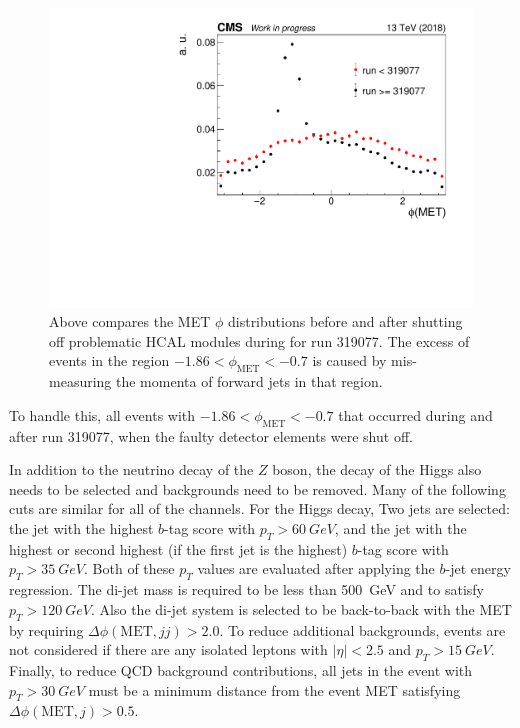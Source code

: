 \begin{figure}
  \centering
  \includegraphics[width=0.8\linewidth]{figures/METPhi319077.pdf}
  \caption[MET $\phi$ distribution before and after shutting off HCAL modules]{
    Above compares the MET $\phi$ distributions before and after shutting off
    problematic HCAL modules during for run 319077.
    The excess of events in the region $-1.86 < \phi_\mathrm{MET} < -0.7$
    is caused by mis-measuring the momenta of forward jets in that region.
  }
  \label{fig:met-peak}
\end{figure}
To handle this, all events with $-1.86 < \phi_\mathrm{MET} < -0.7$ that occurred
during and after run 319077, when the faulty detector elements were shut off.

In addition to the neutrino decay of the $Z$ boson,
the \bb decay of the Higgs also needs to be selected and backgrounds need to be removed.
Many of the following cuts are similar for all of the channels.
For the Higgs decay, Two jets are selected:
the jet with the highest $b$-tag score with $p_T > \SI{60}{GeV}$,
and the jet with the highest or second highest (if the first jet is the highest)
$b$-tag score with $p_T > \SI{35}{GeV}$.
Both of these $p_T$ values are evaluated after applying the $b$-jet energy regression.
The di-jet mass is required to be less than \SI{500}{GeV} and to satisfy $p_T > \SI{120}{GeV}$.
Also the di-jet system is selected to be back-to-back with the MET
by requiring $\Delta\phi(\mathrm{MET}, jj) > 2.0$.
To reduce additional backgrounds, events are not considered if there are any isolated leptons
with $|\eta| < 2.5$ and $p_T > \SI{15}{GeV}$.
Finally, to reduce QCD background contributions, all jets in the event with $p_T > \SI{30}{GeV}$
must be a minimum distance from the event MET satisfying $\Delta \phi(\mathrm{MET}, j) > 0.5$.


